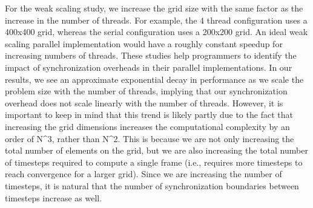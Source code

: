 For the weak scaling study, we increase the grid size with the same
factor as the increase in the number of threads. For example, the 4
thread configuration uses a 400x400 grid, whereas the serial
configuration uses a 200x200 grid. An ideal weak scaling parallel
implementation would have a roughly constant speedup for increasing
numbers of threads. These studies help programmers to identify the impact
of synchronization overheads in their parallel implementations. In our
results, we see an approximate exponential decay in performance as we
scale the problem size with the number of threads, implying that our
synchronization overhead does not scale linearly with the number of
threads. However, it is important to keep in mind that this trend is
likely partly due to the fact that increasing the grid dimensions
increases the computational complexity by an order of N^3, rather than
N^2. This is because we are not only increasing the total number of
elements on the grid, but we are also increasing the total number of
timesteps required to compute a single frame (i.e., requires more
timesteps to reach convergence for a larger grid). Since we are
increasing the number of timesteps, it is natural that the number of
synchronization boundaries between timesteps increase as well.


